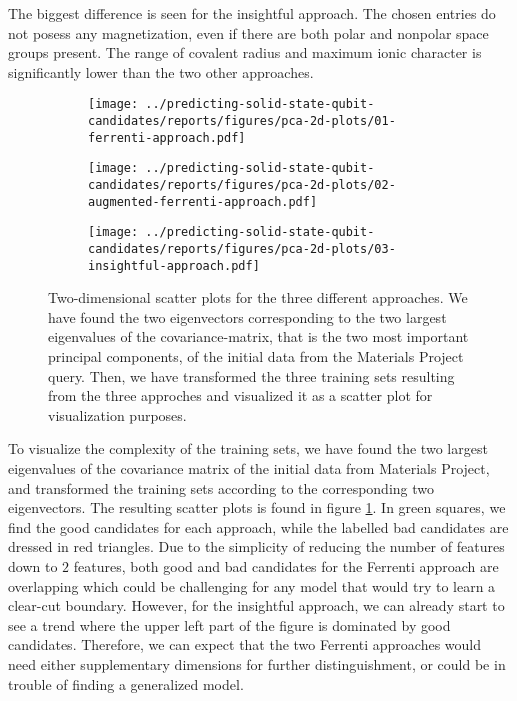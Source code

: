 The biggest difference is seen for the insightful approach. The chosen entries do not posess any magnetization, even if there are both polar and nonpolar space groups present. The range of covalent radius and maximum ionic character is significantly lower than the two other approaches.

\begin{figure}[!tbp]
    \centering
    \begin{subfigure}{0.5\textwidth}
        \centering
        \texttt{[image: ../predicting-solid-state-qubit-candidates/reports/figures/pca-2d-plots/01-ferrenti-approach.pdf]}
    \end{subfigure}%
    \begin{subfigure}{0.5\textwidth}
        \centering
        \texttt{[image: ../predicting-solid-state-qubit-candidates/reports/figures/pca-2d-plots/02-augmented-ferrenti-approach.pdf]}
    \end{subfigure}
    \begin{subfigure}{0.5\textwidth}
        \centering
        \texttt{[image: ../predicting-solid-state-qubit-candidates/reports/figures/pca-2d-plots/03-insightful-approach.pdf]}
    \end{subfigure}
    \vspace*{-95mm}
    \caption{Two-dimensional scatter plots for the three different approaches. We have found the two eigenvectors corresponding to the two largest eigenvalues of the covariance-matrix, that is the two most important principal components, of the initial data from the Materials Project query. Then, we have transformed the three training sets resulting from the three approches and visualized it as a scatter plot for visualization purposes.}
    \label{fig:2dscatterplotpca}
\end{figure}

To visualize the complexity of the training sets, we have found the two largest eigenvalues of the covariance matrix of the initial data from Materials Project, and transformed the training sets according to the corresponding two eigenvectors. The resulting scatter plots is found in figure \ref{fig:2dscatterplotpca}. In green squares, we find the good candidates for each approach, while the labelled bad candidates are dressed in red triangles. Due to the simplicity of reducing the number of features down to $2$ features, both good and bad candidates for the Ferrenti approach are overlapping which could be challenging for any model that would try to learn a clear-cut boundary. However, for the insightful approach, we can already start to see a trend where the upper left part of the figure is dominated by good candidates. Therefore, we can expect that the two Ferrenti approaches would need either supplementary dimensions for further distinguishment, or could be in trouble of finding a generalized model.


